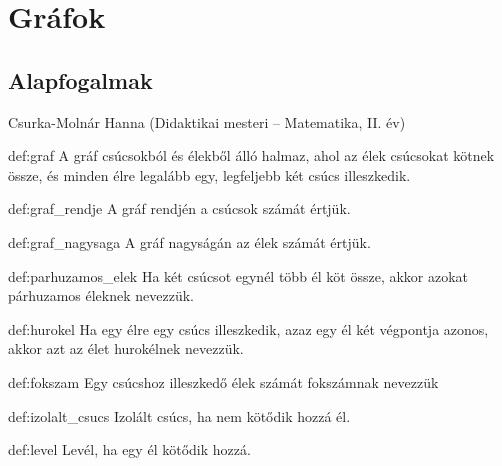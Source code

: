 
\chapter{Gráfok}\label{chap:grafok}
\section{Alapfogalmak}\label{sec:graf_alapok}
\begin{description}
{\large\item [{Szerző:}] Csurka-Molnár Hanna (Didaktikai mesteri -- Matematika, II.
év) }
\end{description}
\begin{definition}[Gráf]{def:graf}
A gráf csúcsokból és élekből álló halmaz, ahol az élek csúcsokat
kötnek össze, és minden élre legalább egy, legfeljebb két csúcs illeszkedik.
\end{definition}

\begin{definition}{def:graf_rendje}
    A gráf rendjén a csúcsok számát értjük.
\end{definition}

\begin{definition}{def:graf_nagysaga}
    A gráf nagyságán az élek számát értjük.
\end{definition}

\begin{definition}{def:parhuzamos_elek}
    Ha két csúcsot egynél több él köt össze, akkor azokat párhuzamos éleknek nevezzük.
\end{definition}

\begin{definition}[Hurokél]{def:hurokel}
    Ha egy élre egy csúcs illeszkedik, azaz egy él két végpontja azonos, akkor azt az élet hurokélnek nevezzük.
\end{definition}

\begin{definition}[Fokszám]{def:fokszam}
    Egy csúcshoz illeszkedő élek számát fokszámnak nevezzük
\end{definition}
\vspace*{1cm}
\begin{definition}{def:izolalt_csucs}
    Izolált csúcs, ha nem kötődik hozzá él.
\end{definition}

\begin{definition}[Levél]{def:level}
    Levél, ha egy él kötődik hozzá.
\end{definition}

